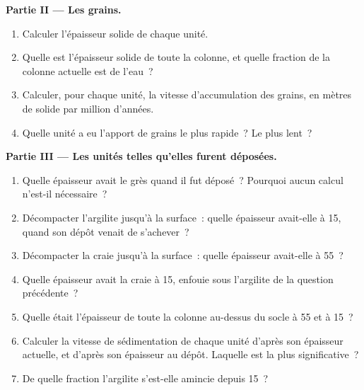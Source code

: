 \begin{problem}
\noindent\textbf{Partie II --- Les grains.}
\begin{enumerate}[resume]
  \item Calculer l'épaisseur solide de chaque unité.
  \item Quelle est l'épaisseur solide de toute la colonne, et quelle fraction de
        la colonne actuelle est de l'eau~?
  \item Calculer, pour chaque unité, la vitesse d'accumulation des grains, en mètres
        de solide par million d'années.
  \item Quelle unité a eu l'apport de grains le plus rapide~? Le plus lent~?
\end{enumerate}

\noindent\textbf{Partie III --- Les unités telles qu'elles furent déposées.}
\begin{enumerate}[resume]
  \item Quelle épaisseur avait le grès quand il fut déposé~? Pourquoi aucun
        calcul n'est-il nécessaire~?
  \item Décompacter l'argilite jusqu'à la surface~: quelle épaisseur avait-elle à \qty{15}{\Ma},
        quand son dépôt venait de s'achever~?
  \item Décompacter la craie jusqu'à la surface~: quelle épaisseur avait-elle à \qty{55}{\Ma}~?
  \item Quelle épaisseur avait la craie à \qty{15}{\Ma}, enfouie sous l'argilite de la
        question précédente~?
  \item Quelle était l'épaisseur de toute la colonne au-dessus du socle à
        \qty{55}{\Ma} et à \qty{15}{\Ma}~?
  \item Calculer la vitesse de sédimentation de chaque unité d'après son épaisseur
        actuelle, et d'après son épaisseur au dépôt. Laquelle est la plus
        significative~?
  \item De quelle fraction l'argilite s'est-elle amincie depuis \qty{15}{\Ma}~?
\end{enumerate}


\end{problem}
